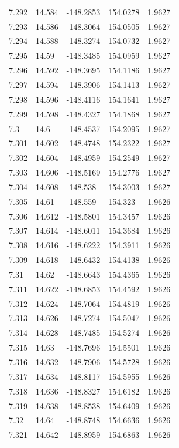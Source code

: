\begin{tabular}{lllll}
7.292 & 14.584 & -148.2853 & 154.0278 & 1.9627 \\
7.293 & 14.586 & -148.3064 & 154.0505 & 1.9627 \\
7.294 & 14.588 & -148.3274 & 154.0732 & 1.9627 \\
7.295 & 14.59 & -148.3485 & 154.0959 & 1.9627 \\
7.296 & 14.592 & -148.3695 & 154.1186 & 1.9627 \\
7.297 & 14.594 & -148.3906 & 154.1413 & 1.9627 \\
7.298 & 14.596 & -148.4116 & 154.1641 & 1.9627 \\
7.299 & 14.598 & -148.4327 & 154.1868 & 1.9627 \\
7.3 & 14.6 & -148.4537 & 154.2095 & 1.9627 \\
7.301 & 14.602 & -148.4748 & 154.2322 & 1.9627 \\
7.302 & 14.604 & -148.4959 & 154.2549 & 1.9627 \\
7.303 & 14.606 & -148.5169 & 154.2776 & 1.9627 \\
7.304 & 14.608 & -148.538 & 154.3003 & 1.9627 \\
7.305 & 14.61 & -148.559 & 154.323 & 1.9626 \\
7.306 & 14.612 & -148.5801 & 154.3457 & 1.9626 \\
7.307 & 14.614 & -148.6011 & 154.3684 & 1.9626 \\
7.308 & 14.616 & -148.6222 & 154.3911 & 1.9626 \\
7.309 & 14.618 & -148.6432 & 154.4138 & 1.9626 \\
7.31 & 14.62 & -148.6643 & 154.4365 & 1.9626 \\
7.311 & 14.622 & -148.6853 & 154.4592 & 1.9626 \\
7.312 & 14.624 & -148.7064 & 154.4819 & 1.9626 \\
7.313 & 14.626 & -148.7274 & 154.5047 & 1.9626 \\
7.314 & 14.628 & -148.7485 & 154.5274 & 1.9626 \\
7.315 & 14.63 & -148.7696 & 154.5501 & 1.9626 \\
7.316 & 14.632 & -148.7906 & 154.5728 & 1.9626 \\
7.317 & 14.634 & -148.8117 & 154.5955 & 1.9626 \\
7.318 & 14.636 & -148.8327 & 154.6182 & 1.9626 \\
7.319 & 14.638 & -148.8538 & 154.6409 & 1.9626 \\
7.32 & 14.64 & -148.8748 & 154.6636 & 1.9626 \\
7.321 & 14.642 & -148.8959 & 154.6863 & 1.9626 \\

\end{tabular}
